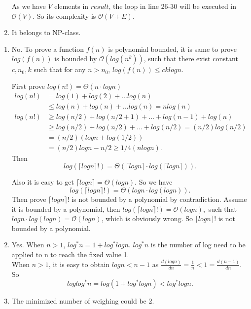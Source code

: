 \documentclass{assignment}
\begin{document}
\begin{homeworkProblem}
\begin{enumerate}
 As we have $V$ elements in $result$, the loop in line 26-30 will be executed in $\mathcal{O}(V)$. So its complexity is $\mathcal{O}(V+E)$.
 \item It belongs to NP-class. 

\end{enumerate}
\end{homeworkProblem}
    \begin{homeworkProblem}
    \begin{enumerate}
\item No. To prove a function $f(n)$ is polynomial bounded, it is same to prove  $log(f(n))$ is bounded by $\mathcal{O}(log(n^k))$, such that there exist constant $c, n_0, k$ such that for any $n > n_0$, $log(f(n)) \leq cklogn$.  

First prove $log(n!) = \Theta(n\cdot logn)$ 
\begin{align*}
log(n!) &= log(1) + log(2) +... log(n) \\
 &\leq log(n)+log(n)+...log(n) = nlog(n) \\
 log(n!) &\geq log(n/2) + log(n/2 + 1) + … +log(n-1) + log(n) \\ &\geq log(n/2)+ log(n/2) + … + log(n/2) = (n/2)log(n/2)  \\ &= (n/2)(logn + log(1/2))\\ &= (n/2)logn - n/2
\geq 1/4(nlogn).
\end{align*}
Then $$log(\lceil logn \rceil !) = \Theta (\lceil logn \rceil \cdot log ( \lceil logn \rceil )).$$

    Also it is easy to get $\lceil logn \rceil = \Theta(logn).$ So we have 
    $$log(\lceil logn \rceil !) = \Theta ( logn  \cdot log ( logn )).$$
   Then prove   $\lceil logn \rceil !$ is not bounded by a polynomial by contradiction. Assume it is bounded by a polynomial, then   $log (\lceil logn \rceil !) = \mathcal{O}(logn ),$ such that $logn  \cdot log ( logn )= \mathcal{O}(logn )$, which is obviously wrong. So  $\lceil logn \rceil !$ is not bounded by a polynomial. 
    \item Yes. When $n>1$, $log^*n = 1 + log^*logn$. $log^*n$ is the number of log need to be applied to n to reach the fixed value 1. \\
    When $n>1$, it is easy to obtain $logn < n -1$ as $\frac{d(logn)}{dn} = \frac{1}{n} < 1 = \frac{d(n-1)}{dn}$. So  $$loglog^*n = log(1 + log^*logn) < log^*logn.$$
    \item The minimized number of weighing could be 2.     
    

\end{enumerate}
\end{homeworkProblem}
\end{document}
